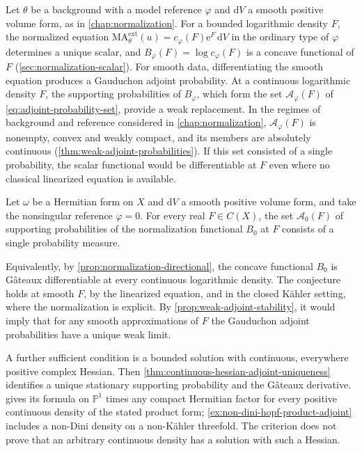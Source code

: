 Let $\theta$ be a background with a model reference $\varphi$ and $\mathrm{d}V$ a smooth positive volume form, as in \cref{chap:normalization}. For a bounded logarithmic density $F$, the normalized equation $\mathrm{MA}^{\mathrm{ext}}_\theta(u)=c_\varphi(F)\mathrm{e}^F\,\mathrm{d}V$ in the ordinary type of $\varphi$ determines a unique scalar, and $B_\varphi(F)=\log c_\varphi(F)$ is a concave functional of $F$ (\cref{sec:normalization-scalar}). For smooth data, differentiating the smooth equation produces a Gauduchon adjoint probability. At a continuous logarithmic density $F$, the supporting probabilities of $B_\varphi$, which form the set $\mathcal A_\varphi(F)$ of \eqref{eq:adjoint-probability-set}, provide a weak replacement. In the regimes of background and reference considered in \cref{chap:normalization}, $\mathcal A_\varphi(F)$ is nonempty, convex and weakly compact, and its members are absolutely continuous (\cref{thm:weak-adjoint-probabilities}). If this set consisted of a single probability, the scalar functional would be differentiable at $F$ even where no classical linearized equation is available.

\begin{conjecture}\label{conj:continuous-gaud-adjoint}
Let $\omega$ be a Hermitian form on $X$ and $\mathrm{d}V$ a smooth positive volume form, and take the nonsingular reference $\varphi=0$. For every real $F\in C(X)$, the set $\mathcal A_0(F)$ of supporting probabilities of the normalization functional $B_0$ at $F$ consists of a single probability measure.
\end{conjecture}

Equivalently, by \cref{prop:normalization-directional}, the concave functional $B_0$ is G\^ateaux differentiable at every continuous logarithmic density. The conjecture holds at smooth $F$, by the linearized equation, and in the closed K\"ahler setting, where the normalization is explicit. By \cref{prop:weak-adjoint-stability}, it would imply that for any smooth approximations of $F$ the Gauduchon adjoint probabilities have a unique weak limit.

A further sufficient condition is a bounded solution with continuous, everywhere positive complex Hessian. Then \cref{thm:continuous-hessian-adjoint-uniqueness} identifies a unique stationary supporting probability and the G\^ateaux derivative.  gives its formula on $\mathbb P^1$ times any compact Hermitian factor for every positive continuous density of the stated product form; \cref{ex:non-dini-hopf-product-adjoint} includes a non-Dini density on a non-K\"ahler threefold. The criterion does not prove that an arbitrary continuous density has a solution with such a Hessian.

